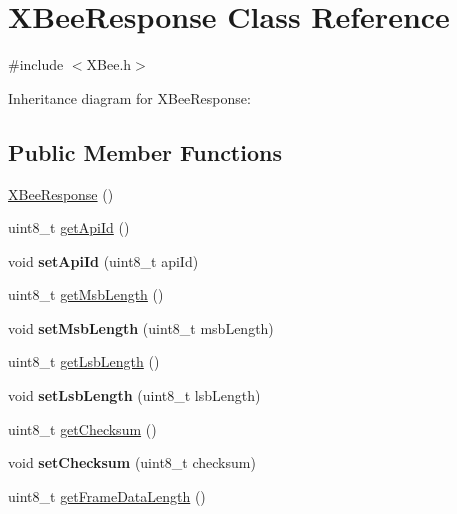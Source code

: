 \hypertarget{class_x_bee_response}{}\section{X\+Bee\+Response Class Reference}
\label{class_x_bee_response}


{\ttfamily \#include $<$X\+Bee.\+h$>$}



Inheritance diagram for X\+Bee\+Response\+:
\subsection*{Public Member Functions}
\begin{DoxyCompactItemize}
\item 
\hyperlink{class_x_bee_response_a03a6ea7651a40062c22ca0a37fbf512f}{X\+Bee\+Response} ()
\item 
uint8\+\_\+t \hyperlink{class_x_bee_response_a4a9677e3b39054119fa278d1ad52130a}{get\+Api\+Id} ()
\item 
\hypertarget{class_x_bee_response_a68177a43b06ba96b901759a491aae073}{}\label{class_x_bee_response_a68177a43b06ba96b901759a491aae073} 
void {\bfseries set\+Api\+Id} (uint8\+\_\+t api\+Id)
\item 
uint8\+\_\+t \hyperlink{class_x_bee_response_aae9f85f70cbcb92cfcc278295a947952}{get\+Msb\+Length} ()
\item 
\hypertarget{class_x_bee_response_a9aa50d1df15ff44b24ffb299854dba74}{}\label{class_x_bee_response_a9aa50d1df15ff44b24ffb299854dba74} 
void {\bfseries set\+Msb\+Length} (uint8\+\_\+t msb\+Length)
\item 
uint8\+\_\+t \hyperlink{class_x_bee_response_acb1b40edafa22461776b75bd5d7caadf}{get\+Lsb\+Length} ()
\item 
\hypertarget{class_x_bee_response_a796fd65123825128715e51e6300e9e58}{}\label{class_x_bee_response_a796fd65123825128715e51e6300e9e58} 
void {\bfseries set\+Lsb\+Length} (uint8\+\_\+t lsb\+Length)
\item 
uint8\+\_\+t \hyperlink{class_x_bee_response_aa8f34253bb77196366ea8ac9bc318734}{get\+Checksum} ()
\item 
\hypertarget{class_x_bee_response_af69cfaa7c99e6aab2236c8f11ab07940}{}\label{class_x_bee_response_af69cfaa7c99e6aab2236c8f11ab07940} 
void {\bfseries set\+Checksum} (uint8\+\_\+t checksum)
\item 
uint8\+\_\+t \hyperlink{class_x_bee_response_a6205be340c4f0397a68dadbdca36a091}{get\+Frame\+Data\+Length} ()

\end{DoxyCompactItemize}
